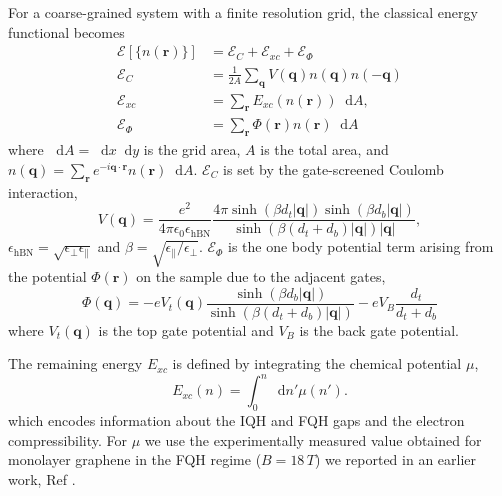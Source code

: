 \documentclass[reprint,prl,aps,superscriptaddress]{revtex4-1}
\newcommand\dif{\mathop{}\!\mathrm{d}}
\begin{document}
For a coarse-grained system with a finite resolution grid, the classical energy functional
becomes
\begin{equation}
    \begin{aligned}
	    \mathcal{E}[\{n(\mathbf{r})\}] &= \mathcal{E}_C + \mathcal{E}_{xc} + \mathcal{E}_{\Phi}\\
	    \mathcal{E}_C &= \frac{1}{2 A} \sum_{\mathbf{q}} V(\mathbf{q}) n(\mathbf{q}) n(-\mathbf{q}) \\
	    \mathcal{E}_{xc} &= \sum_{\mathbf{r}} E_{xc}(n(\mathbf{r})) \dif A,\\
	    \mathcal{E}_{\Phi} &= \sum_{\mathbf{r}} \Phi(\mathbf{r}) n(\mathbf{r}) \dif A
	\end{aligned}
	\label{eq:energy_functional}
\end{equation}
where $\dif A = \dif x \dif y$ is the grid area, $A$ is the total area, and $n(\mathbf{q}) = \sum_{\mathbf{r}} e^{-i \mathbf{q} \cdot \mathbf{r}} n(\mathbf{r}) \dif A$.
$\mathcal{E}_C$ is set by the gate-screened Coulomb interaction,
\begin{equation}
    V(\mathbf{q})= \frac{e^2}{4 \pi \epsilon_0 \epsilon_{\mathrm{hBN}}} \frac{4 \pi \sinh \left( \beta d_t|\mathbf{q}| \right) \sinh \left(\beta d_b|\mathbf{q}|\right)}{\sinh \left(\beta(d_t + d_b)|\mathbf{q}| \right) |\mathbf{q}|},
    \label{eq:gate_potential}
\end{equation}
$\epsilon_{\mathrm{hBN}} = \sqrt{\epsilon_{\perp} \epsilon_{\|}}$ and $\beta = \sqrt{\epsilon_{\|} / \epsilon_{\perp}}$. 
$\mathcal{E}_{\Phi}$ is the one body potential term arising from the potential $\Phi(\mathbf{r})$ on the sample due to the adjacent gates,
\begin{equation}
    \Phi(\mathbf{q}) = - e V_{t}(\mathbf{q}) \frac{\sinh(\beta d_b|\mathbf{q}|)}{\sinh(\beta(d_t + d_b)|\mathbf{q}|)} - e V_B \frac{d_t}{d_t + d_b} 
\end{equation}
where $V_{t}(\mathbf{q})$ is the top gate potential and $V_B$ is the back gate potential.

The remaining energy $E_{xc}$ is defined by integrating the chemical potential $\mu$,
\begin{equation}
    E_{xc}(n) = \int_0^{n} \dif n' \mu(n').
\end{equation}
which  encodes information about the IQH and FQH gaps and the electron compressibility. For $\mu$ we use the experimentally  measured value obtained for monolayer graphene in the FQH regime ($B = 18 \, \si{T}$) we reported in an earlier work, Ref \cite{yang_experimental_2021}.
\end{document}
